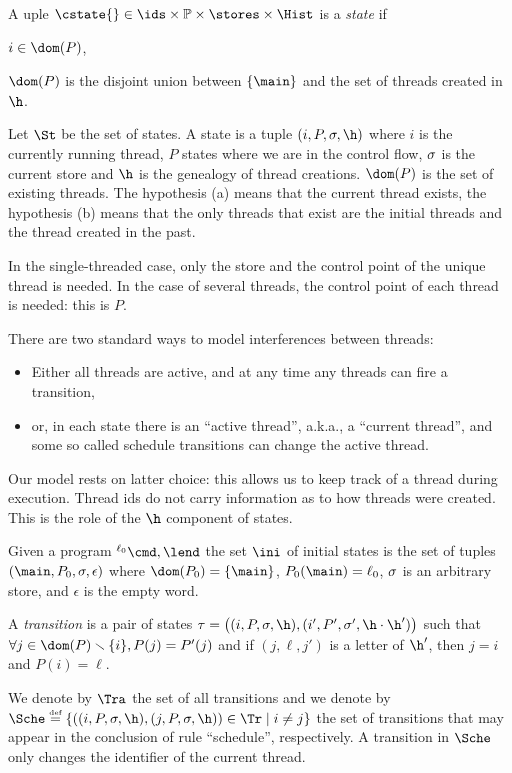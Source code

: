 \documentclass[12pt]{article}
\newcommand{\egdef}{\stackrel{\text{\tiny def}}{=}}
\newcommand{\li}[1]{ {}^{\ell_{#1}}  }
\begin{document}
A uple \(\cstate{}\in\ids\times \mathbb{P}\times \stores \times \Hist\) is a \emph{state} if
 \begin{inparaenum}[(a)]
  \item \(i\in\dom(P)\),
  \item \(\dom(P)\) is the disjoint union between \(\{\main\}\) and the set of threads created in \(\h\).
 \end{inparaenum}
 Let \(\St\) be the set of states.
A state is a tuple \( (i,P,\m,\h)\) where \(i\) is the currently running thread, \(P\) states where we are in the control flow, \(\sigma\) is the current store and \(\h\) is the genealogy of thread creations. \(\dom(P)\) is the set of existing threads.
The hypothesis (a) means that the current thread exists, the hypothesis (b) means that the only threads that exist are the initial threads and the thread created in the past.

In the single-threaded case, only the store and the control point of the unique thread is needed. In the case of several threads, the control point of each thread is needed: this is \(P\).

There are two standard ways to model interferences between threads:
\begin{itemize}
  \item Either all threads are active, and at any time any threads can fire a transition,
 \item or, in each state there is an ``active thread'', a.k.a., a ``current thread'', and some so called schedule transitions can change the active thread.
\end{itemize}
Our model rests on latter choice: this allows us to keep track of a thread during execution.
Thread ids do not carry information as to how threads were created. This is the role of the \(\h\) component of states. 






Given a program \(\li0\cmd,\lend\) the set \(\ini\) of initial states 
is the set of tuples \( (\main,P_0 , \m,\epsilon)\) where \(\dom(P_0)=\{\main\}\), \(P_0(\main)=\ell_0\), \(\sigma\) is an arbitrary store, and \(\epsilon\) is the empty word.

A \emph{transition} is a pair of states \(\tau=\big((i,P,\m,\h),(i',P',\m',\h\cdot\h')\big)\) such that \(\forall j\in\dom(P)\smallsetminus\{i\}, P(j)=P'(j)\) and if \((j,\ell,j')\) is a letter of \(\h'\), then \(j=i\) and \(P(i)=\ell\).

 We denote by \(\Tra\) the set of all transitions and we denote by \(\Sche\egdef\{((i,P,\m,\h),(j,P,\m,\h))\in\Tr\mid i\neq j \}\) the set of transitions that may appear in the conclusion of rule ``schedule'', respectively.
  A transition in \(\Sche\) only changes the identifier of the current thread. 
\figrules
\end{document}
